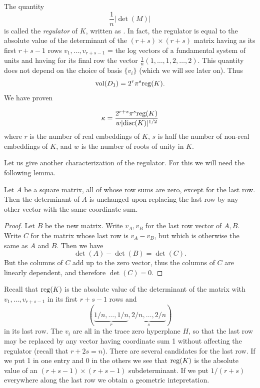 \documentclass[10pt,a4paper,reqno]{amsart}
\begin{document}
\begin{ap}
The quantity \[\frac{1}{n} |\det(M)|\] is called the \emph{regulator} of $K$,
written as . In fact, the regulator is equal to the absolute value of
the determinant of the $(r+s)\times(r+s)$ matrix having as its first $r+s-1$
rows $v_1,\dots,v_{r+s-1}$ = the log vectors of a fundamental system of units
and having for its final row the vector $\frac{1}{n} (1,\dots,1,2,\dots,2).$
This quantity does not depend on the choice of basis $\{v_i\}$ (which we will
see later on). Thus \[\mathrm{vol}(D_1) = 2^r\pi^s\mathrm{reg}(K).\] We have proven
\end{ap}

\begin{thm}
\[\kappa = \frac{2^{r+s}\pi^s \mathrm{reg}(K)}{w|\mathrm{disc}(K)|^{1/2}}\] where $r$ is the
number of real embeddings of $K$, $s$ is half the number of non-real embeddings
of $K$, and $w$ is the number of roots of unity in $K$.
\end{thm}

Let us give another characterization of the regulator. For this we will need
the following lemma.

\begin{lem}
Let $A$ be a square matrix, all of whose row sums are zero, except for the last
row. Then the determinant of $A$ is unchanged upon replacing the last row by
any other vector with the same coordinate sum.
\end{lem}

\begin{proof}
Let $B$ be the new matrix. Write $v_A,v_B$ for the last row vector of $A,B$.
Write $C$ for the matrix whose last row is $v_A - v_B$, but which is otherwise
the same as $A$ and $B$. Then we have \[\det(A) - \det(B) = \det(C).\] But the
columns of $C$ add up to the zero vector, thus the columns of $C$ are linearly
dependent, and therefore $\det(C) = 0$.
\end{proof}

Recall that $\mathrm{reg}(K)$ is the absolute value of the determinant of the matrix
with $v_1,\dots,v_{r+s-1}$ in its first $r+s-1$ rows and \[
(\underbrace{1/n,\dots,1/n}_{r},\underbrace{2/n,\dots,2/n}_{s}) \] in its last
row. The $v_i$ are all in the trace zero hyperplane $H$, so that the last row
may be replaced by any vector having coordinate sum 1 without affecting the
regulator (recall that $r+2s=n$). There are several candidates for the last
row. If we put 1 in one entry and 0 in the others we see that $\mathrm{reg}(K)$ is the
absolute value of an $(r+s-1)\times(r+s-1)$ subdeterminant. If we put $1/(r+s)$
everywhere along the last row we obtain a geometric intepretation.
\end{document}
